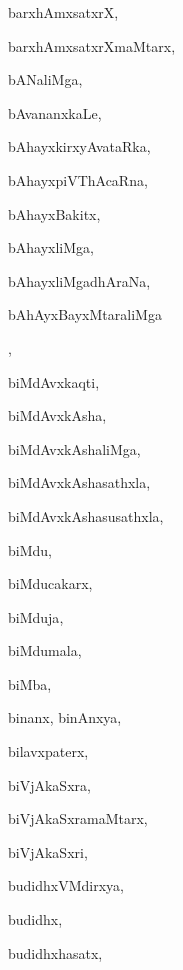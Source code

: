 \begin{multicols}{3}
{\noindent
{barxhAmxsatxrX}, \pageref{barxhAmxsatxrX}

\noindent
{barxhAmxsatxrXmaMtarx}, \pageref{barxhAmxsatxrXmaMtarx}

\noindent
{bANaliMga}, \pageref{bANaliMga}

\noindent
{bAvananxkaLe}, \pageref{bAvananxkaLe}

\noindent
{bAhayxkirxyAvataRka}, \pageref{bAhayxkirxyAvataRka}

\noindent
{bAhayxpiVThAcaRna}, \pageref{bAhayxpiVThAcaRna}

\noindent
{bAhayxBakitx}, \pageref{bAhayxBakitx}

\noindent
{bAhayxliMga}, \pageref{bAhayxliMga}

\noindent
{bAhayxliMgadhAraNa}, \pageref{bAhayxliMgadhAraNa}

\noindent
{bAhAyxBayxMtaraliMga}

\noindent
{}, \pageref{bAhAyxBayxMtaraliMgasaMyoVgasathxla}

\noindent
{biMdAvxkaqti}, \pageref{biMdAvxkaqti}

\noindent
{biMdAvxkAsha}, \pageref{biMdAvxkAsha}

\noindent
{biMdAvxkAshaliMga}, \pageref{biMdAvxkAshaliMga}

\noindent
{biMdAvxkAshasathxla}, \pageref{biMdAvxkAshasathxla}

\noindent
{biMdAvxkAshasusathxla}, \pageref{biMdAvxkAshasusathxla}

\noindent
{biMdu}, \pageref{biMdu}

\noindent
{biMducakarx}, \pageref{biMducakarx}

\noindent
{biMduja}, \pageref{biMduja}

\noindent
{biMdumala}, \pageref{biMdumala}

\noindent
{biMba}, \pageref{biMba}

\noindent
{binanx, binAnxya}, \pageref{binanx, binAnxya}

\noindent
{bilavxpaterx}, \pageref{bilavxpaterx}

\noindent
{biVjAkaSxra}, \pageref{biVjAkaSxra}

\noindent
{biVjAkaSxramaMtarx}, \pageref{biVjAkaSxramaMtarx}

\noindent
{biVjAkaSxri}, \pageref{biVjAkaSxri}

\noindent
{budidhxVMdirxya}, \pageref{budidhxVMdirxya}

\noindent
{budidhx}, \pageref{budidhx}

\noindent
{budidhxhasatx}, \pageref{budidhxhasatx}

}
\end{multicols}
